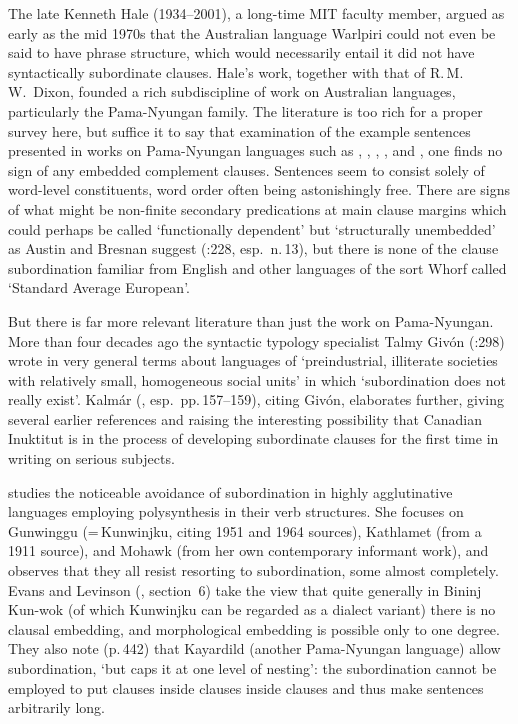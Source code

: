 \documentclass[output=paper,colorlinks,citecolor=brown
]{langscibook}
\begin{document}
The late Kenneth Hale (1934--2001), a long-time MIT faculty member,
argued as early as the mid 1970s that the Australian language Warlpiri
could not even be said to have phrase structure, which would necessarily
entail it did not have syntactically subordinate clauses. Hale's work,
together with that of R.\,M.\,W.\ Dixon, founded a rich subdiscipline
of work on Australian languages, particularly the Pama-Nyungan family.
The literature is too rich for a proper survey here, but suffice it to
say that examination of the example sentences presented in works on
Pama-Nyungan languages such as \citet{Hale76}, \citet{Nash80},
\citet{Dixon81}, \citet{AustBres96}, and \citet{Pensalfini04},
one finds no sign of any embedded complement clauses. Sentences
seem to consist solely of word-level constituents, word order often
being astonishingly free. There are signs of what might be non-finite
secondary predications at main clause margins which could perhaps be
called `functionally dependent' but `structurally unembedded' as
Austin and Bresnan suggest (\citeyear{AustBres96}:228, esp.\ n.\,13),
but there is none of the clause subordination familiar from English
and other languages of the sort Whorf called `Standard Average European'.

But there is far more relevant literature than just the work on
Pama-Nyungan. More than four decades ago the syntactic typology
specialist Talmy Giv{\'o}n (\citeyear{Givon79}:298) wrote in very
general terms about languages of `preindustrial, illiterate societies
with relatively small, homogeneous social units' in which
`subordination does not really exist'. Kalm{\'a}r (\citeyear{Kalmar85},
esp.\ pp.\,157--159), citing Giv{\'o}n, elaborates further, giving
several earlier references and raising the interesting possibility
that Canadian Inuktitut is in the process of developing subordinate
clauses for the first time in writing on serious subjects.

\citet{Mithun84} studies the noticeable avoidance of subordination
in highly agglutinative languages employing polysynthesis in their
verb structures. She focuses on Gunwinggu (=\,Kunwinjku, citing 1951
and 1964 sources), Kathlamet (from a 1911 source), and Mohawk (from
her own contemporary informant work), and observes that they all
resist resorting to subordination, some almost completely. Evans and
Levinson (\citeyear{EvanLevi09}, section~6) take the view that quite
generally in Bininj Kun-wok (of which Kunwinjku can be regarded as a
dialect variant) there is no clausal embedding, and morphological
embedding is possible only to one degree. They also note (p.\,442)
that Kayardild (another Pama-Nyungan language) allow subordination,
`but caps it at one level of nesting': the subordination cannot be
employed to put clauses inside clauses inside clauses and thus make
sentences arbitrarily long.
\end{document}
